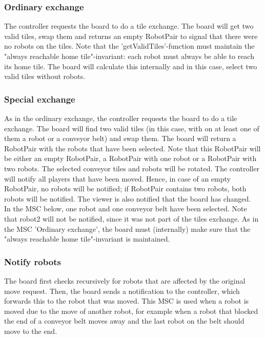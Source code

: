 	\subsubsection{Ordinary exchange}
	\begin{minipage}{\linewidth}
		The controller requests the board to do a tile exchange. The board will get two valid tiles, swap them and returns an empty RobotPair to signal that there were no robots on the tiles. Note that the 'getValidTiles'-function must maintain the "always reachable home tile"-invariant: each robot must always be able to reach its home tile. The board will calculate this internally and in this case, select two valid tiles without robots.

		
	\end{minipage}

	\subsubsection{Special exchange}
	\begin{minipage}{\linewidth}
		As in the ordinary exchange, the controller requests the board to do a tile exchange. The board will find two valid tiles (in this case, with on at least one of them a robot or a conveyor belt) and swap them. The board will return a RobotPair with the robots that have been selected. Note that this RobotPair will be either an empty RobotPair, a RobotPair with one robot or a RobotPair with two robots. The selected conveyor tiles and robots will be rotated. The controller will notify all players that have been moved. Hence, in case of an empty RobotPair, no robots will be notified; if RobotPair contains two robots, both robots will be notified. The viewer is also notified that the board has changed. \\
In the MSC below, one robot and one conveyor belt have been selected. Note that robot2 will not be notified, since it was not part of the tiles exchange. As in the MSC 'Ordinary exchange', the board must (internally) make sure that the "always reachable home tile"-invariant is maintained.

		
	\end{minipage}	

	\subsubsection{Notify robots}
	\begin{minipage}{\linewidth}
		The board first checks recursively for robots that are affected by the original move request. Then, the board sends a notification to the controller, which forwards this to the robot that was moved. This MSC is used when a robot is moved due to the move of another robot, for example when a robot that blocked the end of a conveyor belt moves away and the last robot on the belt should move to the end.

		
	\end{minipage}

